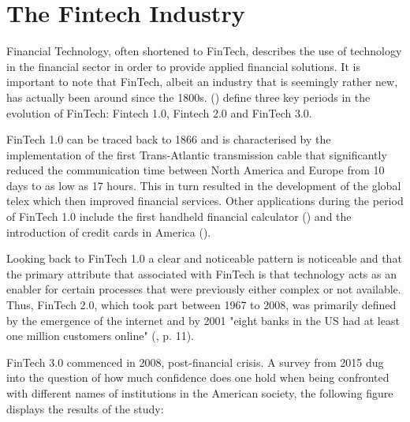 \documentclass[11pt,a4paper]{article}
\begin{document}
\newpage
\section{The Fintech Industry} %
\label{fintech_industry}

Financial Technology, often shortened to FinTech, describes the use of technology in the financial sector in order to provide applied financial solutions.  It is important to note that FinTech, albeit an industry that is seemingly rather new, has actually been around since the 1800s. \citeauthor{buckleyEvolutionFintechNew2016} (\citeyear{buckleyEvolutionFintechNew2016}) define three key periods in the evolution of FinTech: Fintech 1.0, Fintech 2.0 and FinTech 3.0.\par
FinTech 1.0 can be traced back to 1866 and is characterised by the implementation of the first Trans-Atlantic transmission cable that significantly reduced the communication time between North America and Europe from 10 days to as low as 17 hours. This in turn resulted in the development of the global telex which then improved financial services. Other applications during the period of FinTech 1.0 include the first handheld financial calculator (\cite{thibodeauTIFirstHandheld2007}) and the introduction of credit cards in America (\cite{markhamFinancialHistoryUnited2015}). \par
Looking back to FinTech 1.0 a clear and noticeable pattern is noticeable and that the primary attribute that associated with FinTech is that technology acts as an enabler for certain processes that were previously either complex or not available. Thus, FinTech 2.0, which took part between 1967 to 2008, was primarily defined by the emergence of the internet and by 2001 "eight banks in the US had at least one million customers online"  (\cite{buckleyEvolutionFintechNew2016}, p. 11). \par 
FinTech 3.0 commenced in 2008, post-financial crisis. A survey from 2015 dug into the question of how much confidence does one hold when being confronted with different names of institutions in the American society,  the following figure displays the results of the study:
\end{document}
